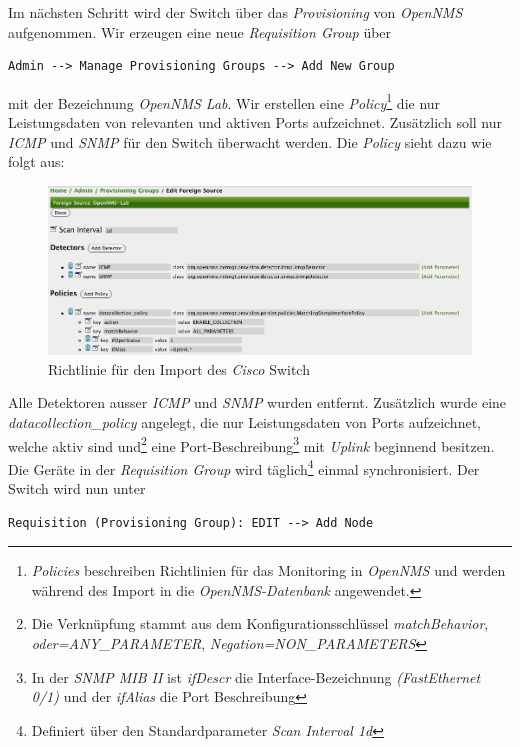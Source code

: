 Im nächsten Schritt wird der Switch über das \textit{Provisioning} von \textit{OpenNMS} aufgenommen. Wir erzeugen eine neue \textit{Requisition Group} über 

\begin{lstlisting}[numbers=none]
Admin --> Manage Provisioning Groups --> Add New Group
\end{lstlisting}

mit der Bezeichnung \textit{OpenNMS Lab}. Wir erstellen eine \textit{Policy}\footnote{\textit{Policies} beschreiben Richtlinien für das Monitoring in \textit{OpenNMS} und werden während des Import in die \textit{OpenNMS-Datenbank} angewendet.} die nur Leistungsdaten von relevanten und aktiven Ports aufzeichnet. Zusätzlich soll nur \textit{ICMP} und \textit{SNMP} für den Switch überwacht werden. Die \textit{Policy} sieht dazu wie folgt aus:

\begin{figure}[H]
	\centering
	\includegraphics[width=1.0\textwidth]{images/use-cases/monitoring-layer-2/requisition-policy}
	\caption{Richtlinie für den Import des \textit{Cisco} Switch}
	\label{pic:requisition-policy}
\end{figure}

Alle Detektoren ausser \textit{ICMP} und \textit{SNMP} wurden entfernt. Zusätzlich wurde eine \textit{datacollection\_policy} angelegt, die nur Leistungsdaten von Ports aufzeichnet, welche aktiv sind und\footnote{Die Verknüpfung stammt aus dem Konfigurationsschlüssel \textit{matchBehavior}, \textit{oder=ANY\_PARAMETER}, \textit{Negation=NON\_PARAMETERS}} eine Port-Beschreibung\footnote{In der \textit{SNMP MIB II} ist \textit{ifDescr} die Interface-Bezeichnung \textit{(FastEthernet 0/1)} und der \textit{ifAlias} die Port Beschreibung} mit \textit{Uplink} beginnend besitzen. Die Geräte in der \textit{Requisition Group} wird täglich\footnote{Definiert über den Standardparameter \textit{Scan Interval 1d}} einmal synchronisiert. Der Switch wird nun unter 

\begin{lstlisting}[numbers=none]
Requisition (Provisioning Group): EDIT --> Add Node
\end{lstlisting}

